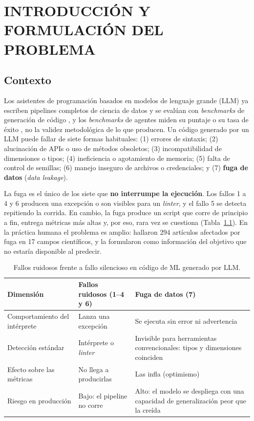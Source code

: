 
\chapter{INTRODUCCIÓN Y FORMULACIÓN DEL PROBLEMA}
\label{ch:introduccion}

\section{Contexto}

Los asistentes de programación basados en modelos de lenguaje grande (LLM) ya escriben pipelines completos de ciencia de datos \parencite{hong2025} y se evalúan con \emph{benchmarks} de generación de código \parencite{lai2023}, y los \emph{benchmarks} de agentes miden su puntaje o su tasa de éxito \parencite{chan2025,huang2024}, no la validez metodológica de lo que producen. Un código generado por un LLM puede fallar de siete formas habituales: (1) errores de sintaxis; (2) alucinación de APIs o uso de métodos obsoletos; (3) incompatibilidad de dimensiones o tipos; (4) ineficiencia o agotamiento de memoria; (5) falta de control de semillas; (6) manejo inseguro de archivos o credenciales; y (7) \textbf{fuga de datos} (\emph{data leakage}).

La fuga es el único de los siete que \textbf{no interrumpe la ejecución}. Los fallos 1 a 4 y 6 producen una excepción o son visibles para un \emph{linter}, y el fallo 5 se detecta repitiendo la corrida. En cambio, la fuga produce un script que corre de principio a fin, entrega métricas más altas y, por eso, rara vez se cuestiona (Tabla~\ref{tab:ruidoso}). En la práctica humana el problema es amplio: \textcite{kapoor2023} hallaron 294 artículos afectados por fuga en 17 campos científicos, y \textcite{kaufman2012} la formularon como información del objetivo que no estaría disponible al predecir.

\begin{table}[H]
\centering
\caption{Fallos ruidosos frente a fallo silencioso en código de ML generado por LLM.}
\label{tab:ruidoso}
\begingroup\footnotesize\singlespacing
\begin{tabular}{@{}p{3.4cm} p{4.6cm} p{7.4cm}@{}}
\toprule
Dimensión & Fallos ruidosos (1--4 y 6) & Fuga de datos (7) \\
\midrule
Comportamiento del intérprete & Lanza una excepción & Se ejecuta sin error ni advertencia \\
Detección estándar & Intérprete o \emph{linter} & Invisible para herramientas convencionales: tipos y dimensiones coinciden \\
Efecto sobre las métricas & No llega a producirlas & Las infla (optimismo) \\
Riesgo en producción & Bajo: el pipeline no corre & Alto: el modelo se despliega con una capacidad de generalización peor que la creída \\
\bottomrule
\end{tabular}
\endgroup
\end{table}

